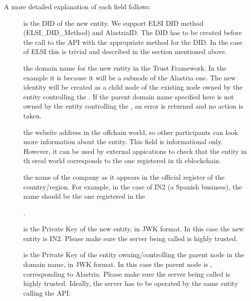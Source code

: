 \documentclass[a4paper,12pt,english,openany]{sphinxmanual}
\begin{document}
\sphinxAtStartPar
A more detailed explanation of each field follows:
\begin{description}
\item[{}] \leavevmode
\sphinxAtStartPar
is the DID of the new entity. We support ELSI DID method (ELSI\_DID\_Method) and AlastriaID. The DID has to be created before the call to the API with the appropriate method for the DID. In the case of ELSI this is trivial and described in the section mentioned above.

\item[{}] \leavevmode
\sphinxAtStartPar
the domain name for the new entity in the Trust Framework. In the example it is  because it will be a sub\sphinxhyphen{}node of the Alastria one. The new identity will be created as a child node of the existing node owned by the entity controlling the . If the parent domain name specified here is not owned by the entity controlling the , an error is returned and no action is taken.

\item[{}] \leavevmode
\sphinxAtStartPar
the website address in the off\sphinxhyphen{}chain world, so other participants can look more information about the entity. This field is informational only. However, it can be used by external appications to check that the entity in th ereal world corresponds to the one registered in th eblockchain.

\item[{}] \leavevmode
\sphinxAtStartPar
the name of the company as it appears in the official register of the country/region. For example, in the case of IN2 (a Spanish business), the name should be the one registered in the %
\begin{footnote}[3]\sphinxAtStartFootnote
{}
%
\end{footnote}.

\item[{}] \leavevmode
\sphinxAtStartPar
is the Private Key of the new entity, in JWK format. In this case the new entity is IN2. Please make sure the server being called is highly trusted.

\item[{}] \leavevmode
\sphinxAtStartPar
is the Private Key of the entity owning/controlling the parent node in the domain name, in JWK format. In this case the parent node is , corresponding to Alastria. Please make sure the server being called is highly trusted. Ideally, the server has to be operated by the same entity calling the API.

\end{description}
\end{document}
